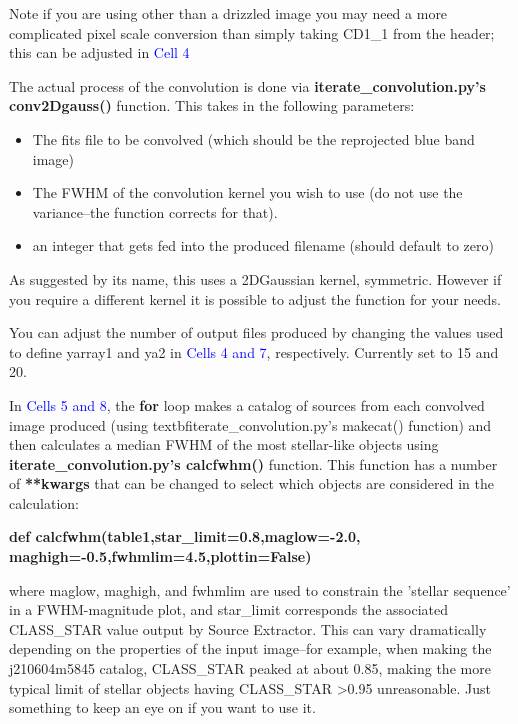 \documentclass[a4paper,10pt]{article}
\begin{document}
Note if you are using other than a drizzled image you may need a more complicated pixel scale conversion than simply taking CD1\_1 from the header; this can be adjusted in \textcolor{blue}{Cell 4}

\noindent The actual process of the convolution is done via \textbf{iterate\_convolution.py's conv2Dgauss()} function. This takes in the following parameters:
\begin{itemize}
 \item The fits file to be convolved (which should be the reprojected blue band image)
 \item The FWHM of the convolution kernel you wish to use (do not use the variance--the function corrects for that).
 \item an integer that gets fed into the produced filename (should default to zero)
\end{itemize}
 
\noindent As suggested by its name, this uses a 2DGaussian kernel, symmetric. However if you require a different kernel it is possible to adjust the function for your needs.

\noindent You can adjust the number of output files produced by changing the values used to define yarray1 and ya2 in \textcolor{blue}{Cells 4 and 7}, respectively. Currently set to 15 and 20.

\noindent In \textcolor{blue}{Cells 5 and 8}, the \textbf{for} loop makes a catalog of sources from each convolved image produced (using 
textbf{iterate\_convolution.py's makecat()} function) and then calculates a median FWHM of the most stellar-like objects using \textbf{iterate\_convolution.py's calcfwhm()} function. This function has a number of \textbf{**kwargs} that can be changed to select which objects are considered in the calculation:

\centerline{\textbf{def calcfwhm(table1,star\_limit=0.8,maglow=-2.0, maghigh=-0.5,fwhmlim=4.5,plottin=False)}}

where maglow, maghigh, and fwhmlim are used to constrain the 'stellar sequence' in a FWHM-magnitude plot, and star\_limit corresponds the associated CLASS\_STAR value output by Source Extractor. This can vary dramatically depending on the properties of the input image--for example, when making the j210604m5845 catalog, CLASS\_STAR peaked at about 0.85, making the more typical limit of stellar objects having CLASS\_STAR \textgreater 0.95 unreasonable. Just something to keep an eye on if you want to use it.
\end{document}
